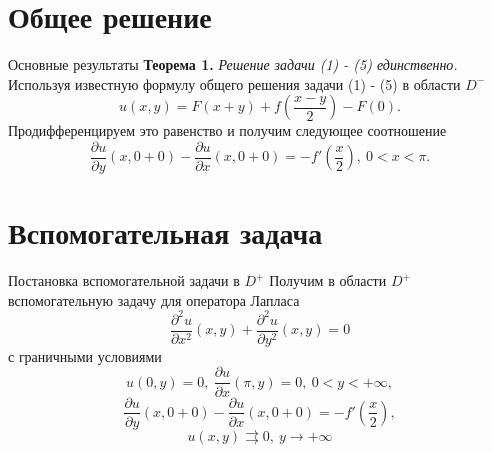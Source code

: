 \documentclass[10pt,pdf,hyperref={unicode}]{beamer}
\begin{document}
\section{Общее решение}
\begin{frame}{Основные результаты}
	\textbf{Теорема 1.} \textit{Решение задачи (1) - (5) единственно.}
	\newline
	\newline
	Используя известную формулу общего решения задачи (1) - (5) в области $D^-$ 
	\begin{equation*}
			u(x,y) = F(x+y) + f(\dfrac{x-y}{2}) - F(0).
	\end{equation*}
	Продифференцируем это равенство и получим следующее соотношение
	\begin{equation*}
		\dfrac{\partial u}{\partial y}(x, 0+0) - \dfrac{\partial u}{\partial x}(x, 0 + 0) = - f'\left(\dfrac{x}2\right), \ 0 < x < \pi. 
	\end{equation*}
\end{frame}
\section{Вспомогательная задача}
\begin{frame}{Постановка вспомогательной задачи в $D^+$}
	Получим в области $D^{+}$ вспомогательную задачу для оператора Лапласа 
	\begin{equation}
		\dfrac{\partial^2 u}{\partial x^2}(x,y) + \dfrac{\partial^2 u}{\partial y^2}(x,y) = 0
	\end{equation}
	с граничными условиями 
	\begin{equation}
		u(0,y) = 0, \ \dfrac{\partial u}{\partial x}(\pi, y) = 0, \ 0 < y < +\infty, 
	\end{equation}
	\begin{equation}
		\dfrac{\partial u}{\partial y}(x,0+0) - \dfrac{\partial u}{\partial x}(x,0+0) = -f'\left(\dfrac{x}{2}\right),
	\end{equation}
	\begin{equation}
		u(x,y) \rightrightarrows 0, \ y \to +\infty 
	\end{equation}
	
\end{frame}
\end{document}
